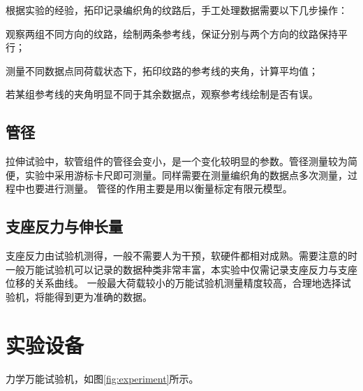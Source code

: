 
根据实验的经验，拓印记录编织角的纹路后，手工处理数据需要以下几步操作：
\begin{compactenum}
\item 观察两组不同方向的纹路，绘制两条参考线，保证分别与两个方向的纹路保持平行；
\item 测量不同数据点同荷载状态下，拓印纹路的参考线的夹角，计算平均值；
\item 若某组参考线的夹角明显不同于其余数据点，观察参考线绘制是否有误。
\end{compactenum}





\subsection{管径}
拉伸试验中，软管组件的管径会变小，是一个变化较明显的参数。管径测量较为简便，实验中采用游标卡尺即可测量。同样需要在测量编织角的数据点多次测量，过程中也要进行测量。
管径的作用主要是用以衡量标定有限元模型。
\subsection{支座反力与伸长量}
支座反力由试验机测得，一般不需要人为干预，软硬件都相对成熟。需要注意的时一般万能试验机可以记录的数据种类非常丰富，本实验中仅需记录支座反力与支座位移的关系曲线。
一般最大荷载较小的万能试验机测量精度较高，合理地选择试验机，将能得到更为准确的数据。







\section{实验设备}

力学万能试验机，如图\ref{fig:experiment}所示。



